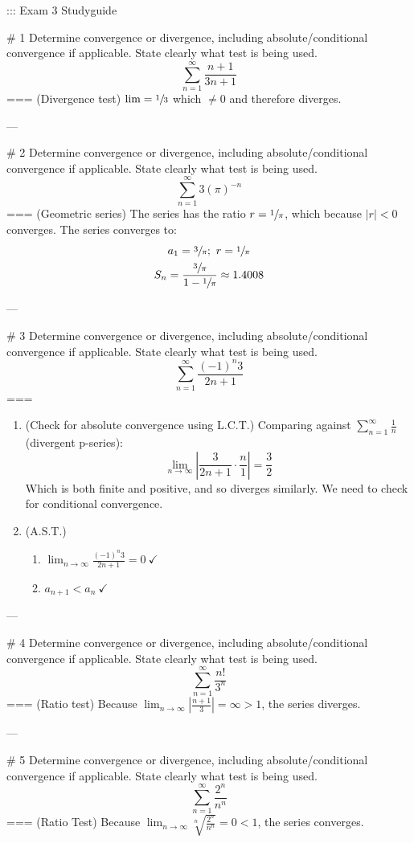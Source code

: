 ::: Exam 3 Studyguide

# 1
Determine convergence or divergence, including absolute/conditional convergence
if applicable. State clearly what test is being used.
\[\sum_{n=1}^\infty \frac{n+1}{3n+1}\]
===
(Divergence test) \(\lim=\sfrac{1}{3}\) which \(\neq 0\) and therefore diverges.

---

# 2
Determine convergence or divergence, including absolute/conditional convergence
if applicable. State clearly what test is being used.
\[\sum_{n=1}^\infty 3{(\pi)}^{-n}\]
===
(Geometric series)
The series has the ratio \(r=\sfrac{1}{\pi}\), which because \(|r|<0\)
converges. The series converges to:
\begin{gather*}
a_1=\sfrac{3}{\pi};\ r=\sfrac{1}{\pi}\\
S_n=\frac{\sfrac{3}{\pi}}{1-\sfrac{1}{\pi}}\approx 1.4008
\end{gather*}

---

# 3
Determine convergence or divergence, including absolute/conditional convergence
if applicable. State clearly what test is being used.
\[\sum_{n=1}^\infty \frac{{(-1)}^n 3}{2n+1}\]
===
\begin{enumerate}
  \item (Check for absolute convergence using L.C.T.) Comparing against
    \(\sum_{n=1}^\infty \frac{1}{n}\) (divergent p-series):
    \[\lim_{n\to\infty}\left|\frac{3}{2n+1}\cdot\frac{n}{1}\right|=\frac{3}{2}\]
    Which is both finite and positive, and so diverges similarly. We need to
    check for conditional convergence.
  \item (A.S.T.)
    \begin{enumerate}
      \item \(\displaystyle \lim_{n\to\infty}\frac{{(-1)}^n
        3}{2n+1}=0\ \checkmark\)
      \item \(a_{n+1}<a_n\ \checkmark\)
    \end{enumerate}
\end{enumerate}

---

# 4
Determine convergence or divergence, including absolute/conditional convergence
if applicable. State clearly what test is being used.
\[\sum_{n=1}^\infty \frac{n!}{3^n}\]
===
(Ratio test) Because \(\lim_{n\to\infty}\left|\frac{n+1}{3}\right|=\infty>1\),
the series diverges.

---

# 5
Determine convergence or divergence, including absolute/conditional convergence
if applicable. State clearly what test is being used.
\[\sum_{n=1}^\infty \frac{2^n}{n^n}\]
===
(Ratio Test) Because \(\lim_{n\to\infty}\sqrt[n]{\frac{2^n}{n^n}}=0<1\), the
series converges.

